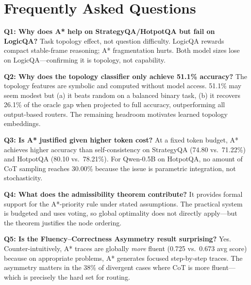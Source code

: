 \documentclass[11pt]{article}
\begin{document}
\section{Frequently Asked Questions}
\label{app:faq}

\noindent\textbf{Q1: Why does A* help on StrategyQA/HotpotQA but fail on LogicQA?}
Task topology effect, not question difficulty. LogicQA rewards compact stable-frame reasoning; A* fragmentation hurts. Both model sizes lose on LogicQA—confirming it is topology, not capability.

\noindent\textbf{Q2: Why does the topology classifier only achieve 51.1\% accuracy?}
The topology features are symbolic and computed without model access. 51.1\% may seem modest but (a) it beats random on a balanced binary task, (b) it recovers 26.1\% of the oracle gap when projected to full accuracy, outperforming all output-based routers. The remaining headroom motivates learned topology embeddings.

\noindent\textbf{Q3: Is A* justified given higher token cost?}
At a fixed token budget, A* achieves higher accuracy than self-consistency on StrategyQA (74.80 vs.\ 71.22\%) and HotpotQA (80.10 vs.\ 78.21\%). For Qwen-0.5B on HotpotQA, no amount of CoT sampling reaches 30.00\% because the issue is parametric integration, not stochasticity.

\noindent\textbf{Q4: What does the admissibility theorem contribute?}
It provides formal support for the A*-priority rule under stated assumptions. The practical system is budgeted and uses voting, so global optimality does not directly apply—but the theorem justifies the node ordering.

\noindent\textbf{Q5: Is the Fluency--Correctness Asymmetry result surprising?}
Yes. Counter-intuitively, A* traces are globally \emph{more} fluent (0.725 vs.\ 0.673 avg score) because on appropriate problems, A* generates focused step-by-step traces. The asymmetry matters in the 38\% of divergent cases where CoT is more fluent—which is precisely the hard set for routing.
\end{document}
